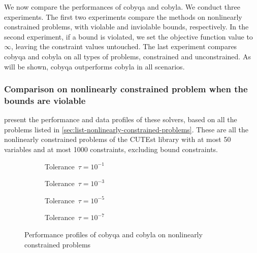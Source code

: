 We now compare the performances of \gls{cobyqa} and \gls{cobyla}.
We conduct three experiments.
The first two experiments compare the methods on nonlinearly constrained problems, with violable and inviolable bounds, respectively.
In the second experiment, if a bound is violated, we set the objective function value to~$\infty$, leaving the constraint values untouched.
The last experiment compares \gls{cobyqa} and \gls{cobyla} on all types of problems, constrained and unconstrained.
As will be shown, \gls{cobyqa} outperforms \gls{cobyla} in all scenarios.

\subsubsection{Comparison on nonlinearly constrained problem when the bounds are violable}

 present the performance and data profiles of these solvers, based on all the problems listed in \cref{sec:list-nonlinearly-constrained-problems}.
These are all the nonlinearly constrained problems of the CUTEst library with at most \num{50} variables and at most \num[group-minimum-digits=4]{1000} constraints, excluding bound constraints.

\begin{figure}[ht]
    \centering
    \begin{subfigure}[b]{0.49\textwidth}
        \centering
        \caption{Tolerance~$\tau = 10^{-1}$}
    \end{subfigure}
    \hfill
    \begin{subfigure}[b]{0.49\textwidth}
        \centering
        \caption{Tolerance~$\tau = 10^{-3}$}
    \end{subfigure}
    \begin{subfigure}[b]{0.49\textwidth}
        \centering
        \caption{Tolerance~$\tau = 10^{-5}$}
    \end{subfigure}
    \hfill
    \begin{subfigure}[b]{0.49\textwidth}
        \centering
        \caption{Tolerance~$\tau = 10^{-7}$}
    \end{subfigure}
    \caption[Performance profiles on nonlinearly constrained problems]{Performance profiles of \gls{cobyqa} and \gls{cobyla} on nonlinearly constrained problems}
    \label{fig:perf-nonlinearly-constrained-problems}
\end{figure}

